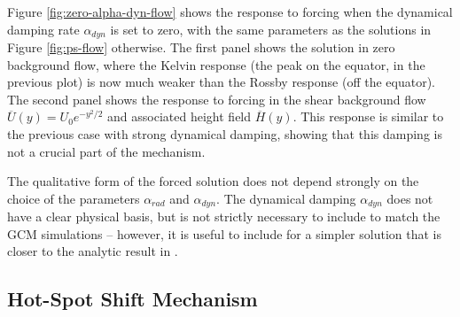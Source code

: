 Figure \ref{fig:zero-alpha-dyn-flow} shows the response to forcing when the dynamical damping rate $\alpha_{dyn}$ is set to zero, with the same parameters as the solutions in Figure \ref{fig:ps-flow} otherwise. The first panel shows the solution in zero background flow, where the Kelvin response (the peak on the equator, in the previous plot) is now much weaker than the Rossby response (off the equator). The second panel shows the response to forcing in the shear background flow $\overline{U}(y) = U_{0} e^{-y^{2}/2}$ and associated height field $\overline{H}(y)$. This response is similar to the previous case with strong dynamical damping, showing that this damping is not a crucial part of the mechanism.




The qualitative form of the forced solution does not depend strongly on the choice of the parameters $\alpha_{rad}$ and $\alpha_{dyn}$. The dynamical damping $\alpha_{dyn}$ does not have a clear physical basis, but is not strictly necessary to include to match the GCM simulations -- however, it is useful to include for a simpler solution that is closer to the analytic result in \citet{matsuno1966quasi}.



\subsection{Hot-Spot Shift Mechanism}


